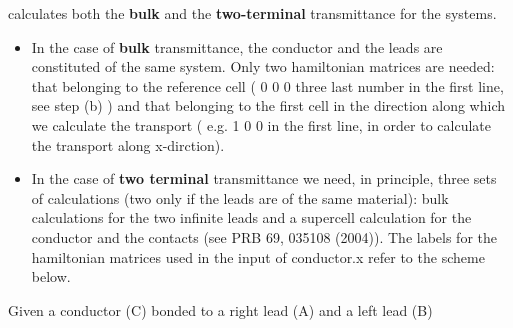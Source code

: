  calculates both the {\bf bulk} and the
{\bf two-terminal} transmittance for the systems.
\begin{itemize}
\item In the case of {\bf bulk} transmittance, the conductor and the leads are
      constituted of the same system.
      Only two hamiltonian matrices are needed: that belonging to the
      reference cell ( 0 0 0 three last number in the first line, see
      step (b) ) and  that  belonging to the first
      cell in the direction along which we calculate the transport ( e.g.
      1 0 0 in the first line, in order to calculate the transport along
      x-dirction).

\item In the case of {\bf two terminal} transmittance we need, in principle, three sets of
      calculations (two only if the leads are of the same material): bulk
      calculations for the two infinite leads and a supercell calculation
      for the conductor and the contacts (see PRB 69, 035108 (2004)).
      The labels for the hamiltonian matrices used in the input of conductor.x refer to the
      scheme below.
\end{itemize}

      Given a conductor (C) bonded to a right lead (A) and a left lead
      (B)\\

